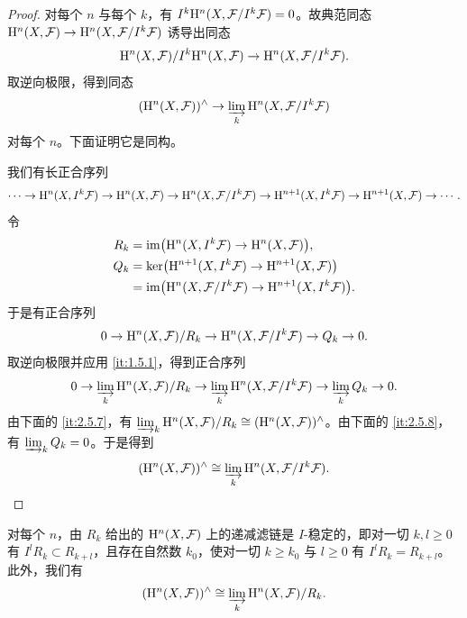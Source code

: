 \begin{proof}
对每个 $n$ 与每个 $k$，有 $I^k\mathrm{H}^n(X,\mathcal{F}/I^k\mathcal{F})=0$。故典范同态 $\mathrm{H}^n(X,\mathcal{F})\to\mathrm{H}^n(X,\mathcal{F}/I^k\mathcal{F})$ 诱导出同态
\[
\mathrm{H}^n(X,\mathcal{F})/I^k\mathrm{H}^n(X,\mathcal{F})\to\mathrm{H}^n(X,\mathcal{F}/I^k\mathcal{F}).
\]
取逆向极限，得到同态
\[
(\mathrm{H}^n(X,\mathcal{F}))^{\wedge}\to\varinjlim_k\mathrm{H}^n(X,\mathcal{F}/I^k\mathcal{F})
\]
对每个 $n$。下面证明它是同构。

我们有长正合序列
\[
\cdots\to\mathrm{H}^n(X,I^k\mathcal{F})\to\mathrm{H}^n(X,\mathcal{F})\to\mathrm{H}^n(X,\mathcal{F}/I^k\mathcal{F})\to\mathrm{H}^{n+1}(X,I^k\mathcal{F})\to\mathrm{H}^{n+1}(X,\mathcal{F})\to\cdots.
\]
令
\[
\begin{aligned}
R_k&=\operatorname{im}\bigl(\mathrm{H}^n(X,I^k\mathcal{F})\to\mathrm{H}^n(X,\mathcal{F})\bigr),\\
Q_k&=\ker\bigl(\mathrm{H}^{n+1}(X,I^k\mathcal{F})\to\mathrm{H}^{n+1}(X,\mathcal{F})\bigr)\\
&=\operatorname{im}\bigl(\mathrm{H}^n(X,\mathcal{F}/I^k\mathcal{F})\to\mathrm{H}^{n+1}(X,I^k\mathcal{F})\bigr).
\end{aligned}
\]
于是有正合序列
\[
0\to\mathrm{H}^n(X,\mathcal{F})/R_k\to\mathrm{H}^n(X,\mathcal{F}/I^k\mathcal{F})\to Q_k\to 0.
\]
取逆向极限并应用 \ref{it:1.5.1}，得到正合序列
\[
0\to\varinjlim_k\mathrm{H}^n(X,\mathcal{F})/R_k\to\varinjlim_k\mathrm{H}^n(X,\mathcal{F}/I^k\mathcal{F})\to\varinjlim_k Q_k\to 0.
\]
由下面的 \ref{it:2.5.7}，有 $\varinjlim_k\mathrm{H}^n(X,\mathcal{F})/R_k\cong(\mathrm{H}^n(X,\mathcal{F}))^{\wedge}$。由下面的 \ref{it:2.5.8}，有 $\varinjlim_k Q_k=0$。于是得到
\[
(\mathrm{H}^n(X,\mathcal{F}))^{\wedge}\cong\varinjlim_k\mathrm{H}^n(X,\mathcal{F}/I^k\mathcal{F}).
\]
\end{proof}

\begin{lemma}\label{it:2.5.7}
对每个 $n$，由 $R_k$ 给出的 $\mathrm{H}^n(X,\mathcal{F})$ 上的递减滤链是 $I$-稳定的，即对一切 $k,l\ge 0$ 有 $I^lR_k\subset R_{k+l}$，且存在自然数 $k_0$，使对一切 $k\ge k_0$ 与 $l\ge 0$ 有 $I^lR_k=R_{k+l}$。此外，我们有
\[
(\mathrm{H}^n(X,\mathcal{F}))^{\wedge}\cong\varinjlim_k\mathrm{H}^n(X,\mathcal{F})/R_k.
\]
\end{lemma}

